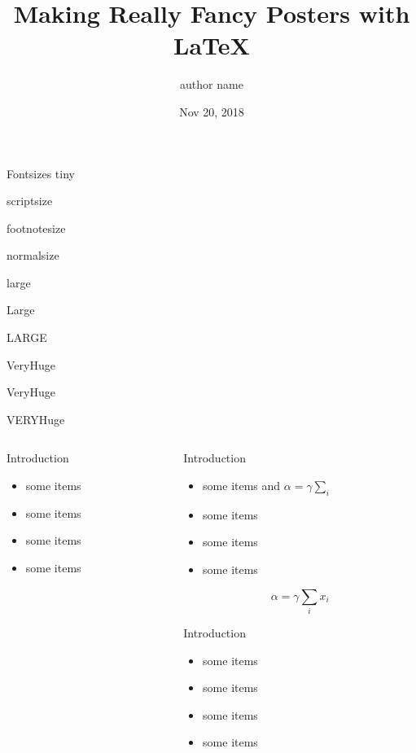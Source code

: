 \documentclass[final, hyperref={pdfpagelabels=false}]{beamer}
\title[Fancy Posters]{Making Really Fancy Posters with \LaTeX}
\author{author name}
\institute[UCLA AOS]{Department of XXX, UCLA}
\date{Nov 20, 2018}
\begin{document}
\begin{frame}{}
\vfill
\begin{block}{\large Fontsizes}
    \centering
    {\tiny tiny}\par
    {\scriptsize scriptsize}\par
    {\footnotesize footnotesize}\par
    {\normalsize normalsize}\par
    {\large large}\par
    {\Large Large}\par
    {\LARGE LARGE}\par
    {\veryHuge VeryHuge}\par
    {\VeryHuge VeryHuge}\par
    {\VERYHuge VERYHuge}\par
\end{block}
\vfill
\begin{columns}[t]
    \begin{column}{.48\linewidth}
    \begin{block}{Introduction}
        \begin{itemize}
        \item some items
        \item some items
        \item some items
        \item \alert{some items}
        \end{itemize}

        \lipsum[1]
    \end{block}

    \end{column}
    \begin{column}{.48\linewidth}
    \begin{block}{Introduction}
        \begin{itemize}
        \item some items and $\alpha=\gamma \sum_{i}$
        \item some items
        \item some items
        \item some items
        \end{itemize}
        $$\alpha=\gamma \sum_{i} x_i$$
    \end{block}

    \begin{block}{Introduction}
        \begin{itemize}
        \item some items
        \item some items
        \item some items
        \item some items
        \end{itemize}
    \end{block}


\end{column}
\end{columns}
\end{frame}
\end{document}
